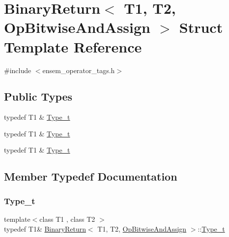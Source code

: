 \hypertarget{structBinaryReturn_3_01T1_00_01T2_00_01OpBitwiseAndAssign_01_4}{}\section{Binary\+Return$<$ T1, T2, Op\+Bitwise\+And\+Assign $>$ Struct Template Reference}
\label{structBinaryReturn_3_01T1_00_01T2_00_01OpBitwiseAndAssign_01_4}


{\ttfamily \#include $<$ensem\+\_\+operator\+\_\+tags.\+h$>$}

\subsection*{Public Types}
\begin{DoxyCompactItemize}
\item 
typedef T1 \& \mbox{\hyperlink{structBinaryReturn_3_01T1_00_01T2_00_01OpBitwiseAndAssign_01_4_af047665bd1eeb8cd1c5b11049e4652a7}{Type\+\_\+t}}
\item 
typedef T1 \& \mbox{\hyperlink{structBinaryReturn_3_01T1_00_01T2_00_01OpBitwiseAndAssign_01_4_af047665bd1eeb8cd1c5b11049e4652a7}{Type\+\_\+t}}
\item 
typedef T1 \& \mbox{\hyperlink{structBinaryReturn_3_01T1_00_01T2_00_01OpBitwiseAndAssign_01_4_af047665bd1eeb8cd1c5b11049e4652a7}{Type\+\_\+t}}
\end{DoxyCompactItemize}


\subsection{Member Typedef Documentation}
\mbox{\label{structBinaryReturn_3_01T1_00_01T2_00_01OpBitwiseAndAssign_01_4_af047665bd1eeb8cd1c5b11049e4652a7}} 
\subsubsection{\texorpdfstring{Type\_t}{Type\_t}\hspace{0.1cm}{\footnotesize\ttfamily [1/3]}}
{\footnotesize\ttfamily template$<$class T1 , class T2 $>$ \\
typedef T1\& \mbox{\hyperlink{structBinaryReturn}{Binary\+Return}}$<$ T1, T2, \mbox{\hyperlink{structOpBitwiseAndAssign}{Op\+Bitwise\+And\+Assign}} $>$\+::\mbox{\hyperlink{structBinaryReturn_3_01T1_00_01T2_00_01OpBitwiseAndAssign_01_4_af047665bd1eeb8cd1c5b11049e4652a7}{Type\+\_\+t}}}


